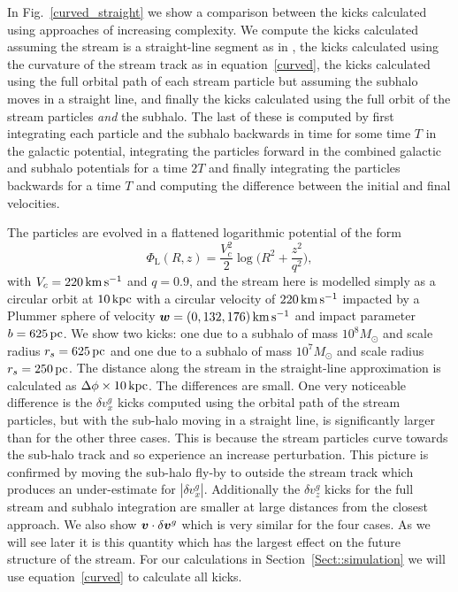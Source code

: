 \documentclass[useAMS,usenatbib,fleqn,a4paper]{mn2e}
\def\kpc{\,{\rm kpc}}
\def\pc{\,{\rm pc}}
\def\kms{\,{\rm km\,s^{-1}}}
\newcommand{\bs}[1]{\bmath{#1}}
\begin{document}
In Fig.~\ref{curved_straight} we show a comparison between the kicks calculated using approaches of increasing complexity. We compute the kicks calculated assuming the stream is a straight-line segment as in \cite{ErkalBelokurov2015}, the kicks calculated using the curvature of the stream track as in equation~\eqref{curved}, the kicks calculated using the full orbital path of each stream particle but assuming the subhalo moves in a straight line, and finally the kicks calculated using the full orbit of the stream particles \emph{and} the subhalo. The last of these is computed by first integrating each particle and the subhalo backwards in time for some time $T$ in the galactic potential, integrating the particles forward in the combined galactic and subhalo potentials for a time $2T$ and finally integrating the particles backwards for a time $T$ and computing the difference between the initial and final velocities.

The particles are evolved in a flattened logarithmic potential of the form
\begin{equation}
\Phi_\mathrm{L}(R,z) = \frac{V_c^2}{2}\log\Big(R^2+\frac{z^2}{q^2}\Big),
\label{potential}
\end{equation}
with $V_c = 220\kms$ and $q = 0.9$, and the stream here is modelled simply as a circular orbit at $10\kpc$ with a circular velocity of $220\kms$ impacted by a Plummer sphere of velocity $\bs{w}=(0,132,176)\kms$ and impact parameter $b=625\pc$. We show two kicks: one due to a subhalo of mass $10^8M_\odot$ and scale radius $r_s=625\pc$ and one due to a subhalo of mass $10^7M_\odot$ and scale radius $r_s=250\pc$. The distance along the stream in the straight-line approximation is calculated as $\Delta\phi\times10\kpc$. The differences are small. One very noticeable difference is the $\delta v^g_x$ kicks computed using the orbital path of the stream particles, but with the sub-halo moving in a straight line, is significantly larger than for the other three cases. This is because the stream particles curve towards the sub-halo track and so experience an increase perturbation. This picture is confirmed by moving the sub-halo fly-by to outside the stream track which produces an under-estimate for $|\delta v^g_x|$. Additionally the $\delta v^g_z$ kicks for the full stream and subhalo integration are smaller at large distances from the closest approach. We also show $\bs{v}\cdot\delta\bs{v}^g$ which is very similar for the four cases. As we will see later it is this quantity which has the largest effect on the future structure of the stream. For our calculations in Section~\ref{Sect::simulation} we will use equation~\eqref{curved} to calculate all kicks.
\end{document}
